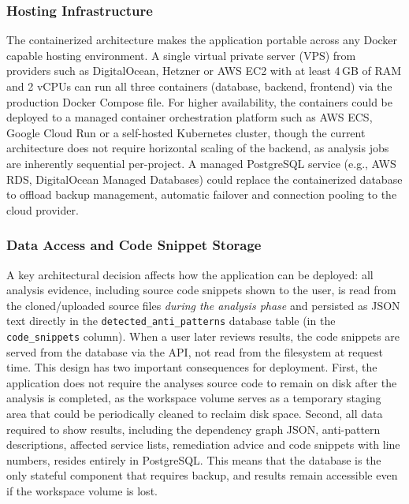 \subsubsection{Hosting Infrastructure}
\label{subsubsec:hosting}

\par The containerized architecture makes the application portable across any Docker capable hosting environment. A single virtual private server (VPS) from providers such as DigitalOcean, Hetzner or AWS EC2 with at least 4\,GB of RAM and 2 vCPUs can run all three containers (database, backend, frontend) via the production Docker Compose file. For higher availability, the containers could be deployed to a managed container orchestration platform such as AWS ECS, Google Cloud Run or a self-hosted Kubernetes cluster, though the current architecture does not require horizontal scaling of the backend, as analysis jobs are inherently sequential per-project. A managed PostgreSQL service (e.g., AWS RDS, DigitalOcean Managed Databases) could replace the containerized database to offload backup management, automatic failover and connection pooling to the cloud provider.

\subsubsection{Data Access and Code Snippet Storage}
\label{subsubsec:data-access}

\par A key architectural decision affects how the application can be deployed: all analysis evidence, including source code snippets shown to the user, is read from the cloned/uploaded source files \textit{during the analysis phase} and persisted as JSON text directly in the \texttt{detected\_anti\_patterns} database table (in the \texttt{code\_snippets} column). When a user later reviews results, the code snippets are served from the database via the API, not read from the filesystem at request time. This design has two important consequences for deployment. First, the application does not require the analyses source code to remain on disk after the analysis is completed, as the workspace volume serves as a temporary staging area that could be periodically cleaned to reclaim disk space. Second, all data required to show results, including the dependency graph JSON, anti-pattern descriptions, affected service lists, remediation advice and code snippets with line numbers, resides entirely in PostgreSQL. This means that the database is the only stateful component that requires backup, and results remain accessible even if the workspace volume is lost.

